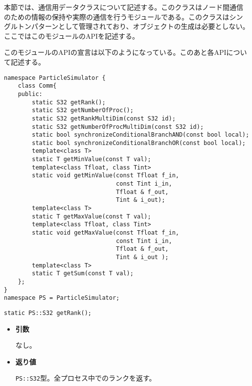 本節では、通信用データクラスについて記述する。このクラスはノード間通信
のための情報の保持や実際の通信を行うモジュールである。このクラスはシン
グルトンパターンとして管理されており、オブジェクトの生成は必要としない。
ここではこのモジュールのAPIを記述する。


このモジュールのAPIの宣言は以下のようになっている。このあと各APIについ
て記述する。
\begin{lstlisting}[caption=Communication]
namespace ParticleSimulator {
    class Comm{
    public:
        static S32 getRank();
        static S32 getNumberOfProc();
        static S32 getRankMultiDim(const S32 id);
        static S32 getNumberOfProcMultiDim(const S32 id);
        static bool synchronizeConditionalBranchAND(const bool local);
        static bool synchronizeConditionalBranchOR(const bool local);
        template<class T>
        static T getMinValue(const T val);
        template<class Tfloat, class Tint>
        static void getMinValue(const Tfloat f_in,
                                const Tint i_in,
                                Tfloat & f_out,
                                Tint & i_out);
        template<class T>
        static T getMaxValue(const T val);
        template<class Tfloat, class Tint>
        static void getMaxValue(const Tfloat f_in,
                                const Tint i_in,
                                Tfloat & f_out,
                                Tint & i_out );
        template<class T>
        static T getSum(const T val);
    };
}
namespace PS = ParticleSimulator;
\end{lstlisting}


\begin{screen}
\begin{verbatim}
static PS::S32 getRank();
\end{verbatim}
\end{screen}

\begin{itemize}

\item{{\bf 引数}}

なし。

\item{{\bf 返り値}}

{\tt PS::S32}型。全プロセス中でのランクを返す。

\end{itemize}

